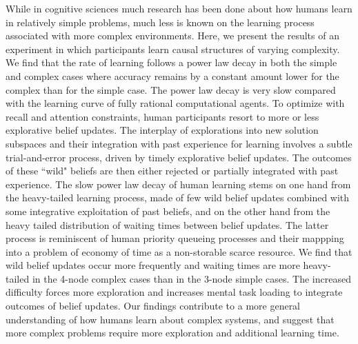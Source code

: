 While in cognitive sciences much research has been done about how humans learn in relatively simple problems, much less is known on the learning process associated with more complex environments. Here, we present the results of an experiment in which participants learn causal structures of varying complexity. We find that the rate of learning follows a power law decay in both the simple and complex cases where accuracy remains by a constant amount lower for the complex than for the simple case. The power law decay is very slow compared with the learning curve of fully rational computational agents. To optimize with recall and attention constraints, human participants resort to more or less explorative belief updates. The interplay of explorations into new solution subspaces and their integration with past experience for learning involves a subtle trial-and-error process, driven by timely explorative belief updates. The outcomes of these ``wild" beliefs are then either rejected or partially integrated with past experience. The slow power law decay of human learning stems on one hand from the heavy-tailed learning process, made of few wild belief updates combined with some integrative exploitation of past beliefs, and on the other hand from the heavy tailed distribution of waiting times between belief updates.  The latter process is reminiscent of human priority queueing processes and their mappping into a problem of economy of time as a non-storable scarce resource. We find that wild belief updates occur more frequently and waiting times are more heavy-tailed in the 4-node complex cases than in the 3-node simple cases. The increased difficulty forces more exploration and increases mental task loading to integrate outcomes of belief updates. Our findings contribute to a more general understanding of how humans learn about complex systems, and suggest that more complex problems require more exploration and additional learning time.